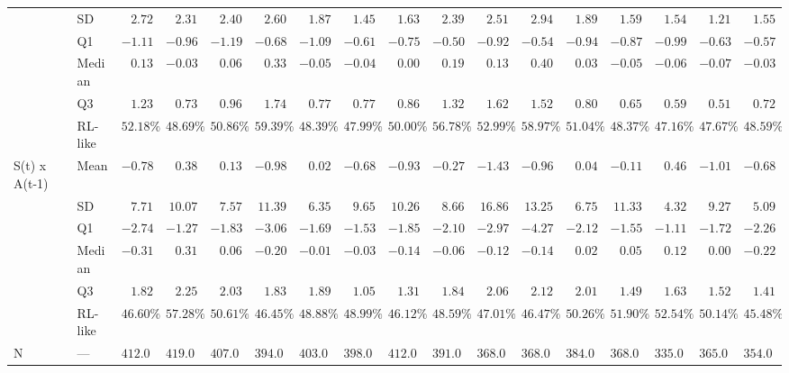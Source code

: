 \documentclass[
  number,
  preprint,
  3p,
  onecolumn]{elsarticle}
\begin{document}
{\begin{longtable}{l|l|rrrrrrrrrrrrrrr}
 & SD & $2.72$ & $2.31$ & $2.40$ & $2.60$ & $1.87$ & $1.45$ & $1.63$ & $2.39$ & $2.51$ & $2.94$ & $1.89$ & $1.59$ & $1.54$ & $1.21$ & $1.55$ \\ 
 & Q1 & $-1.11$ & $-0.96$ & $-1.19$ & $-0.68$ & $-1.09$ & $-0.61$ & $-0.75$ & $-0.50$ & $-0.92$ & $-0.54$ & $-0.94$ & $-0.87$ & $-0.99$ & $-0.63$ & $-0.57$ \\ 
 & Median & $0.13$ & $-0.03$ & $0.06$ & $0.33$ & $-0.05$ & $-0.04$ & $0.00$ & $0.19$ & $0.13$ & $0.40$ & $0.03$ & $-0.05$ & $-0.06$ & $-0.07$ & $-0.03$ \\ 
 & Q3 & $1.23$ & $0.73$ & $0.96$ & $1.74$ & $0.77$ & $0.77$ & $0.86$ & $1.32$ & $1.62$ & $1.52$ & $0.80$ & $0.65$ & $0.59$ & $0.51$ & $0.72$ \\ 
 & RL-like & $52.18\%$ & $48.69\%$ & $50.86\%$ & $59.39\%$ & $48.39\%$ & $47.99\%$ & $50.00\%$ & $56.78\%$ & $52.99\%$ & $58.97\%$ & $51.04\%$ & $48.37\%$ & $47.16\%$ & $47.67\%$ & $48.59\%$ \\ 
\midrule\addlinespace[2.5pt]
S(t) x 
 A(t-1) & Mean & $-0.78$ & $0.38$ & $0.13$ & $-0.98$ & $0.02$ & $-0.68$ & $-0.93$ & $-0.27$ & $-1.43$ & $-0.96$ & $0.04$ & $-0.11$ & $0.46$ & $-1.01$ & $-0.68$ \\ 
 & SD & $7.71$ & $10.07$ & $7.57$ & $11.39$ & $6.35$ & $9.65$ & $10.26$ & $8.66$ & $16.86$ & $13.25$ & $6.75$ & $11.33$ & $4.32$ & $9.27$ & $5.09$ \\ 
 & Q1 & $-2.74$ & $-1.27$ & $-1.83$ & $-3.06$ & $-1.69$ & $-1.53$ & $-1.85$ & $-2.10$ & $-2.97$ & $-4.27$ & $-2.12$ & $-1.55$ & $-1.11$ & $-1.72$ & $-2.26$ \\ 
 & Median & $-0.31$ & $0.31$ & $0.06$ & $-0.20$ & $-0.01$ & $-0.03$ & $-0.14$ & $-0.06$ & $-0.12$ & $-0.14$ & $0.02$ & $0.05$ & $0.12$ & $0.00$ & $-0.22$ \\ 
 & Q3 & $1.82$ & $2.25$ & $2.03$ & $1.83$ & $1.89$ & $1.05$ & $1.31$ & $1.84$ & $2.06$ & $2.12$ & $2.01$ & $1.49$ & $1.63$ & $1.52$ & $1.41$ \\ 
 & RL-like & $46.60\%$ & $57.28\%$ & $50.61\%$ & $46.45\%$ & $48.88\%$ & $48.99\%$ & $46.12\%$ & $48.59\%$ & $47.01\%$ & $46.47\%$ & $50.26\%$ & $51.90\%$ & $52.54\%$ & $50.14\%$ & $45.48\%$ \\ 
\midrule\addlinespace[2.5pt]
N & — & $412.00$ & $419.00$ & $407.00$ & $394.00$ & $403.00$ & $398.00$ & $412.00$ & $391.00$ & $368.00$ & $368.00$ & $384.00$ & $368.00$ & $335.00$ & $365.00$ & $354.00$ \\ 
\bottomrule

\end{longtable}

}
\newpage
{}
\recalctypearea
\end{document}
